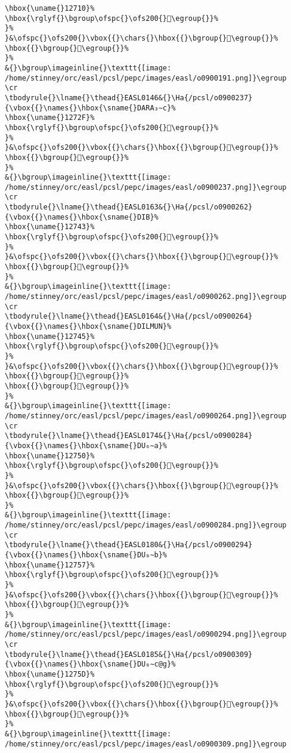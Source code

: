 \begin{verbatim}
\hbox{\uname{}12710}%
\hbox{\rglyf{}\bgroup\ofspc{}\ofs200{}𒜐\egroup{}}%
}%
}&\ofspc{}\ofs200{}\vbox{{}\chars{}\hbox{{}\bgroup{}𒜐\egroup{}}%
\hbox{{}\bgroup{}𒜑\egroup{}}%
}%
&{}\bgroup\imageinline{}\texttt{[image: /home/stinney/orc/easl/pcsl/pepc/images/easl/o0900191.png]}\egroup
\cr
\tbodyrule{}\lname{}\thead{}EASL0146&{}\Ha{/pcsl/o0900237}{\vbox{{}\names{}\hbox{\sname{}DARA₃∼c}%
\hbox{\uname{}1272F}%
\hbox{\rglyf{}\bgroup\ofspc{}\ofs200{}𒜯\egroup{}}%
}%
}&\ofspc{}\ofs200{}\vbox{{}\chars{}\hbox{{}\bgroup{}𒜯\egroup{}}%
\hbox{{}\bgroup{}𒜲\egroup{}}%
}%
&{}\bgroup\imageinline{}\texttt{[image: /home/stinney/orc/easl/pcsl/pepc/images/easl/o0900237.png]}\egroup
\cr
\tbodyrule{}\lname{}\thead{}EASL0163&{}\Ha{/pcsl/o0900262}{\vbox{{}\names{}\hbox{\sname{}DIB}%
\hbox{\uname{}12743}%
\hbox{\rglyf{}\bgroup\ofspc{}\ofs200{}𒝃\egroup{}}%
}%
}&\ofspc{}\ofs200{}\vbox{{}\chars{}\hbox{{}\bgroup{}𒝃\egroup{}}%
\hbox{{}\bgroup{}𒝄\egroup{}}%
}%
&{}\bgroup\imageinline{}\texttt{[image: /home/stinney/orc/easl/pcsl/pepc/images/easl/o0900262.png]}\egroup
\cr
\tbodyrule{}\lname{}\thead{}EASL0164&{}\Ha{/pcsl/o0900264}{\vbox{{}\names{}\hbox{\sname{}DILMUN}%
\hbox{\uname{}12745}%
\hbox{\rglyf{}\bgroup\ofspc{}\ofs200{}𒝅\egroup{}}%
}%
}&\ofspc{}\ofs200{}\vbox{{}\chars{}\hbox{{}\bgroup{}𒝇\egroup{}}%
\hbox{{}\bgroup{}𒝅\egroup{}}%
\hbox{{}\bgroup{}𒝆\egroup{}}%
}%
&{}\bgroup\imageinline{}\texttt{[image: /home/stinney/orc/easl/pcsl/pepc/images/easl/o0900264.png]}\egroup
\cr
\tbodyrule{}\lname{}\thead{}EASL0174&{}\Ha{/pcsl/o0900284}{\vbox{{}\names{}\hbox{\sname{}DU₆∼a}%
\hbox{\uname{}12750}%
\hbox{\rglyf{}\bgroup\ofspc{}\ofs200{}𒝐\egroup{}}%
}%
}&\ofspc{}\ofs200{}\vbox{{}\chars{}\hbox{{}\bgroup{}𒝑\egroup{}}%
\hbox{{}\bgroup{}𒝐\egroup{}}%
}%
&{}\bgroup\imageinline{}\texttt{[image: /home/stinney/orc/easl/pcsl/pepc/images/easl/o0900284.png]}\egroup
\cr
\tbodyrule{}\lname{}\thead{}EASL0180&{}\Ha{/pcsl/o0900294}{\vbox{{}\names{}\hbox{\sname{}DU₈∼b}%
\hbox{\uname{}12757}%
\hbox{\rglyf{}\bgroup\ofspc{}\ofs200{}𒝗\egroup{}}%
}%
}&\ofspc{}\ofs200{}\vbox{{}\chars{}\hbox{{}\bgroup{}𒝗\egroup{}}%
\hbox{{}\bgroup{}𒝘\egroup{}}%
}%
&{}\bgroup\imageinline{}\texttt{[image: /home/stinney/orc/easl/pcsl/pepc/images/easl/o0900294.png]}\egroup
\cr
\tbodyrule{}\lname{}\thead{}EASL0185&{}\Ha{/pcsl/o0900309}{\vbox{{}\names{}\hbox{\sname{}DU₈∼c@g}%
\hbox{\uname{}1275D}%
\hbox{\rglyf{}\bgroup\ofspc{}\ofs200{}𒝝\egroup{}}%
}%
}&\ofspc{}\ofs200{}\vbox{{}\chars{}\hbox{{}\bgroup{}𒝝\egroup{}}%
\hbox{{}\bgroup{}𒝞\egroup{}}%
}%
&{}\bgroup\imageinline{}\texttt{[image: /home/stinney/orc/easl/pcsl/pepc/images/easl/o0900309.png]}\egroup

\end{verbatim}
